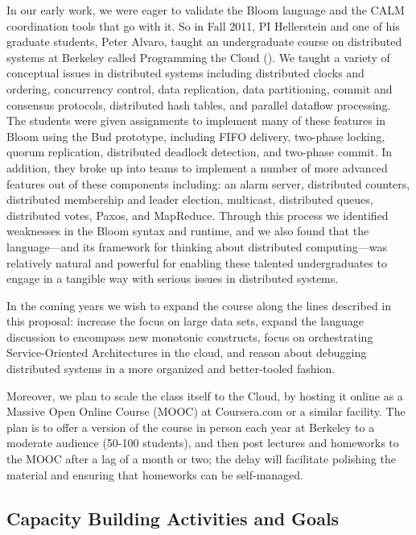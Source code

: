 In our early work, we were eager to validate the Bloom language and the CALM coordination tools that go with it.  So in Fall 2011, PI Hellerstein and one of his graduate students, Peter Alvaro, taught an undergraduate course on distributed systems at Berkeley called Programming the Cloud ().  We taught a variety of conceptual issues in distributed systems including distributed clocks and ordering, concurrency control, data replication, data partitioning, commit and consensus protocols, distributed hash tables, and parallel dataflow processing.  The students were given assignments to implement many of these features in Bloom using the Bud prototype, including FIFO delivery, two-phase locking, quorum replication,  distributed deadlock detection, and two-phase commit.  In addition, they broke up into teams to implement a number of more advanced features out of these components including: an alarm server, distributed counters, distributed membership and leader election, multicast, distributed queues, distributed votes, Paxos, and MapReduce.  Through this process we identified weaknesses in the Bloom syntax and runtime, and we also found that the language---and its framework for thinking about distributed computing---was relatively natural and powerful for enabling these talented undergraduates to engage in a tangible way with serious issues in distributed systems.

In the coming years we wish to expand the course along the lines described in this proposal: increase the focus on large data sets, expand the language discussion to encompass new monotonic constructs, focus on orchestrating Service-Oriented Architectures in the cloud, and reason about debugging distributed systems in a more organized and better-tooled fashion.  

Moreover, we plan to scale the class itself to the Cloud, by hosting it online as a Massive Open Online Course (MOOC) at Coursera.com or a similar facility.  The plan is to offer a version of the course in person each year at Berkeley to a moderate audience (50-100 students), and then post lectures and homeworks to the MOOC after a lag of a month or two; the delay will facilitate polishing the material and ensuring that homeworks can be self-managed.



\subsection{Capacity Building Activities and Goals}

